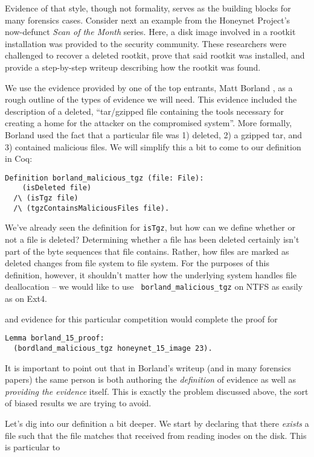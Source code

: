 \documentclass[nocopyrightspace]{sigplanconf}
\begin{document}
Evidence of that style, though not formality, serves as the building blocks
for many forensics cases. Consider next an example \cite{honeynet-15} from the
Honeynet Project's now-defunct {\it Scan of the Month} series. Here, a disk
image involved in a rootkit installation was provided to the security
community. These researchers were challenged to recover a deleted rootkit,
prove that said rootkit was installed, and provide a step-by-step writeup
describing how the rootkit was found.

We use the evidence provided by one of the top entrants, Matt Borland
\cite{borland-honeynet}, as a rough outline of the types of evidence we will
need. This evidence included the description of a deleted, ``tar/gzipped file
containing the tools necessary for creating a home for the attacker on the
compromised system''. More formally, Borland used the fact that a particular
file was 1) deleted, 2) a gzipped tar, and 3) contained malicious files. We 
will simplify this a bit to come to our definition in Coq:

\begin{lstlisting}
Definition borland_malicious_tgz (file: File):
    (isDeleted file)
  /\ (isTgz file)
  /\ (tgzContainsMaliciousFiles file).
\end{lstlisting}

We've already seen the definition for {\tt isTgz}, but how can we define
whether or not a file is deleted? Determining whether a file has been deleted
certainly isn't part of the byte sequences that file contains. Rather, how
files are marked as deleted changes from file system to file system. For the
purposes of this definition, however, it shouldn't matter how the underlying
system handles file deallocation -- we would like to use {\tt
borland\_malicious\_tgz} on NTFS as easily as on Ext4.


and evidence for this particular competition would complete the proof for

\begin{lstlisting}
Lemma borland_15_proof: 
  (bordland_malicious_tgz honeynet_15_image 23).
\end{lstlisting}

It is important to point out that in Borland's writeup (and in many forensics
papers) the same person is both authoring the {\it definition} of evidence as
well as {\it providing the evidence} itself. This is exactly the problem
discussed above, the sort of biased results we are trying to avoid.

Let's dig into our definition a bit deeper. We start by declaring that there
{\it exists} a file such that the file matches that received from reading
inodes on the disk. This is particular to 
\end{document}
